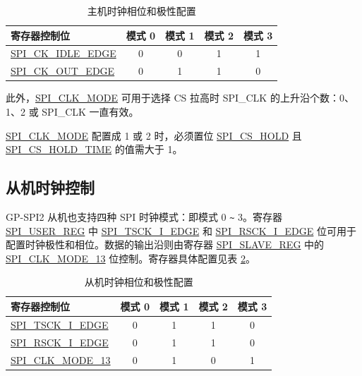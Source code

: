 \documentclass[main\_\_CN.tex]{subfiles}
\begin{document}
\begin{table}[H]
    \centering
    \caption{主机时钟相位和极性配置}
    \label{tab:spi-clk-phase-polarity-config-master}
    \begin{tabular}[c]{|p{3.5cm}|c|c|c|c|}
    \hline
    \rowcolor{lightgray}
    寄存器控制位 & 模式 0 & 模式 1 & 模式 2 & 模式 3\\
    \hline
   \hyperref[fielddesc:SPICKIDLEEDGE]{SPI\_CK\_IDLE\_EDGE}  & 0     & 0     & 1     & 1\\
    \hline
   \hyperref[fielddesc:SPICKOUTEDGE]{SPI\_CK\_OUT\_EDGE}   & 0     & 1     & 1     & 0\\
    \hline
    \end{tabular}
\end{table}

此外，\hyperref[fielddesc:SPICLKMODE]{SPI\_CLK\_MODE} 可用于选择 CS 拉高时 SPI\_CLK 的上升沿个数：0、1、2 或 SPI\_CLK 一直有效。

\begin{tiplisting}
 \hyperref[fielddesc:SPICLKMODE]{SPI\_CLK\_MODE} 配置成 1 或 2 时，必须置位 \hyperref[fielddesc:SPICSHOLD]{SPI\_CS\_HOLD} 且 \hyperref[fielddesc:SPICSHOLDTIME]{SPI\_CS\_HOLD\_TIME} 的值需大于 1。
\end{tiplisting}
\vspace{-1em}

\subsection{从机时钟控制}\label{sec:spi-slave-clock-control}

GP-SPI2 从机也支持四种 SPI 时钟模式：即模式 0 \verb+~+ 3。寄存器 \hyperref[regdesc:SPIUSERREG]{SPI\_USER\_REG} 中 \hyperref[fielddesc:SPITSCKIEDGE]{SPI\_TSCK\_I\_EDGE} 和 \hyperref[fielddesc:SPIRSCKIEDGE]{SPI\_RSCK\_I\_EDGE} 位可用于配置时钟极性和相位。数据的输出沿则由寄存器 \hyperref[regdesc:SPISLAVEREG]{SPI\_SLAVE\_REG} 中的 \hyperref[fielddesc:SPICLKMODE13]{SPI\_CLK\_MODE\_13} 位控制。寄存器具体配置见表  \ref{tab:spi-clk-phase-polarity-config-slave}。

\begin{table}[H]
    \centering
    \caption{从机时钟相位和极性配置}
    \label{tab:spi-clk-phase-polarity-config-slave}
    \begin{tabular}[c]{|p{3.5cm}|c|c|c|c|}
    \hline
    \rowcolor{lightgray}
    寄存器控制位 & 模式 0 & 模式 1 & 模式 2 & 模式 3\\
    \hline
   \hyperref[fielddesc:SPITSCKIEDGE]{SPI\_TSCK\_I\_EDGE}   & 0 & 1 & 1 & 0\\
    \hline
   \hyperref[fielddesc:SPIRSCKIEDGE]{SPI\_RSCK\_I\_EDGE}   & 0 & 1 & 1 & 0\\
    \hline
   \hyperref[fielddesc:SPICLKMODE13]{SPI\_CLK\_MODE\_13}     & 0 & 1 & 0 & 1\\
    \hline
    \end{tabular}
\end{table}
\end{document}
